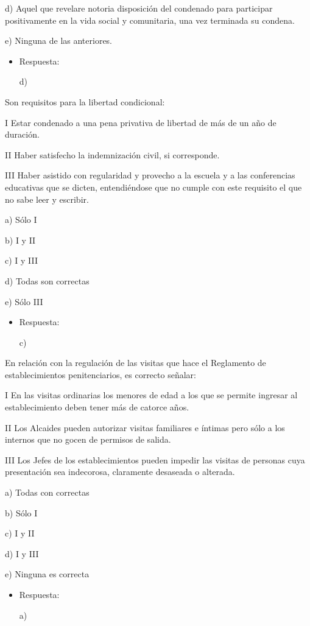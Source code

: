 \documentclass[letterpaper, 11pt]{article}
\begin{document}
d) Aquel que revelare notoria disposición del condenado para
participar positivamente en la vida social y comunitaria, una vez
terminada su condena.

e) Ninguna de las anteriores.


\begin{itemize}
\item Respuesta:

d)
\end{itemize}


Son requisitos para la libertad condicional:

I Estar condenado a una pena privativa de libertad de más de un año de
duración.

II Haber satisfecho la indemnización civil, si corresponde.

III Haber asistido con regularidad y provecho a la escuela y a las
conferencias educativas que se dicten, entendiéndose que no cumple con
este requisito el que no sabe leer y escribir.

a) Sólo I

b) I y II

c) I y III

d) Todas son correctas

e) Sólo III

\begin{itemize}
\item Respuesta:

c)
\end{itemize}


En relación con la regulación de las visitas que hace el Reglamento de
establecimientos penitenciarios, es correcto señalar:


I En las visitas ordinarias los menores de edad a los que se permite
ingresar al establecimiento deben tener más de catorce años.

II Los Alcaides pueden autorizar visitas familiares e íntimas pero
sólo a los internos que no gocen de permisos de salida.

III Los Jefes de los establecimientos pueden impedir las visitas de
personas cuya presentación sea indecorosa, claramente desaseada o
alterada.


a) Todas con correctas

b) Sólo I

c) I y II

d) I y III

e) Ninguna es correcta

\begin{itemize}
\item Respuesta:

a)
\end{itemize}
\end{document}
